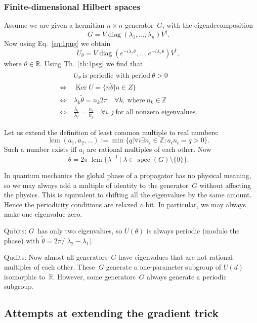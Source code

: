 \documentclass[aps,pra,10pt,twocolumn,groupedaddress,nofootinbib]{revtex4-1}
\theoremstyle{plain}
\DeclareMathOperator{\diag}{diag}  %
\DeclareMathOperator{\Ker}{Ker}    %
\DeclareMathOperator{\spec}{spec}  %
\DeclareMathOperator{\lcm}{lcm}    %
\newcommand{\be}{\begin{equation}}
\newcommand{\ee}{\end{equation}}
\newcommand{\Z}{\ensuremath{\mathbb Z}}  %
\newcommand{\R}{\ensuremath{\mathbb R}}  %
\begin{document}
\subsubsection{Finite-dimensional Hilbert spaces}


Assume we are given a hermitian $n \times n$ generator~$G$, with the eigendecomposition
\be
G = V \diag(\lambda_1, \ldots, \lambda_n) V^\dagger.
\ee
Now using Eq.~\eqref{eq:1pug} we obtain
\be
U_\theta
= V \diag(e^{-i\lambda_1 \theta}, \ldots, e^{-i\lambda_n \theta}) V^\dagger,
\ee
where $\theta \in \R$. Using Th.~\ref{th:1psg} we find that
\begin{align}
  & U_\theta \: \text{is periodic with period} \: \tilde{\theta} > 0\\
  \iff \: & \Ker U = \{n \tilde{\theta} | n \in Z\}\\
  \iff \: & \lambda_k \tilde{\theta} = n_k 2 \pi \quad \forall k, \: \text{where} \: n_k \in \Z\\
  \iff \: & \frac{\lambda_i}{\lambda_j} = \frac{n_i}{n_j} \quad \forall i,j
  \: \text{for all nonzero eigenvalues.}
\end{align}

Let us extend the definition of least common multiple to real numbers:
\be
\lcm(a_1, a_2, \ldots) := \min \{q | \forall i \exists n_i \in \Z: a_i n_i = q>0\}.
\ee
Such a number exists iff $a_i$ are rational multiples of each other.
Now
\be
\tilde{\theta} = 2\pi \: \lcm \{\lambda^{-1} \:|\: \lambda \in \spec(G) \setminus \{0\}\}.
\ee

In quantum mechanics the global phase of a propagator has no physical meaning, so we may always add
a multiple of identity to the generator~$G$ without affecting the physics.
This is equivalent to shifting all the eigenvalues by the same amount.
Hence the periodicity conditions are relaxed a bit. In particular, we may always make one eigenvalue zero.


Qubits:
$G$~has only two eigenvalues, so $U(\theta)$ is always periodic (modulo the phase)
with $\tilde{\theta} = 2\pi/|\lambda_2-\lambda_1|$.

Qudits:
Now almost all generators~$G$ have eigenvalues that are not rational multiples of each other.
These~$G$ generate a one-parameter subgroup of $U(d)$ isomorphic to~$\R$.
However, some generators~$G$ always generate a periodic subgroup.


\subsection{Attempts at extending the gradient trick}
\end{document}
